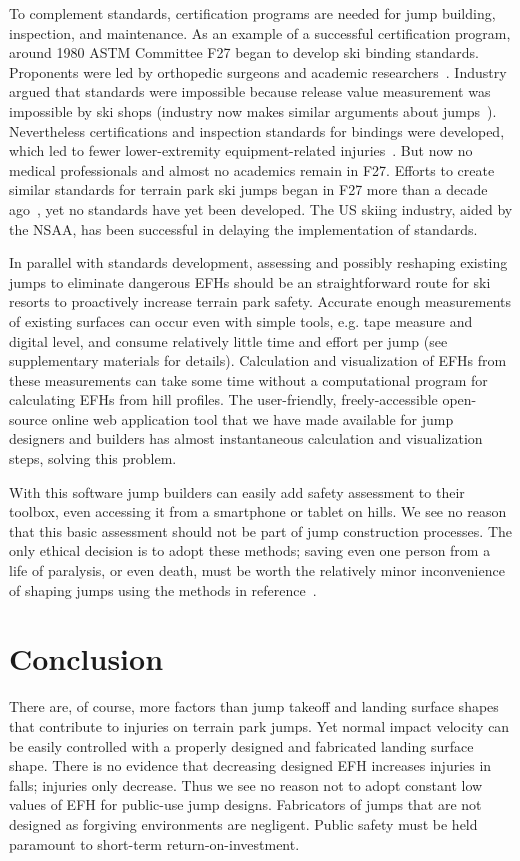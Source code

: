 \documentclass[smallextended]{svjour3}       %
\begin{document}
To complement standards, certification programs are needed for jump building,
inspection, and maintenance. As an example of a successful certification
program, around 1980 ASTM Committee F27 began to develop ski binding standards.
Proponents were led by orthopedic surgeons and academic
researchers~\cite{Bahniuk1996}. Industry argued that standards were impossible
because release value measurement was impossible by ski shops (industry now
makes similar arguments about jumps~\cite{NSAA2015}). Nevertheless
certifications and inspection standards for bindings were developed, which led
to fewer lower-extremity equipment-related injuries~\cite{Bahniuk1996}. But now
no medical professionals and almost no academics remain in F27. Efforts to
create similar standards for terrain park ski jumps began in F27 more than a
decade ago~\cite{SAM2011}, yet no standards have yet been developed. The US
skiing industry, aided by the NSAA, has been successful in delaying the
implementation of standards.

In parallel with standards development, assessing and possibly reshaping
existing jumps to eliminate dangerous EFHs should be an straightforward route
for ski resorts to proactively increase terrain park safety. Accurate enough
measurements of existing surfaces can occur even with simple tools, e.g. tape
measure and digital level, and consume relatively little time and effort per
jump (see supplementary materials for details). Calculation and visualization
of EFHs from these measurements can take some time without a computational
program for calculating EFHs from hill profiles. The user-friendly,
freely-accessible open-source online web application tool that we have made
available for jump designers and builders has almost instantaneous calculation
and visualization steps, solving this problem.

With this software jump builders can easily add safety assessment to their
toolbox, even accessing it from a smartphone or tablet on hills.  We see no
reason that this basic assessment should not be part of jump construction
processes. The only ethical decision is to adopt these methods; saving even one
person from a life of paralysis, or even death, must be worth the relatively
minor inconvenience of shaping jumps using the methods in
reference~\cite{Levy2015}.

\section{Conclusion}
\label{sec:conc}
%
There are, of course, more factors than jump takeoff and landing surface shapes
that contribute to injuries on terrain park jumps. Yet normal impact velocity
can be easily controlled with a properly designed and fabricated landing
surface shape. There is no evidence that decreasing designed EFH increases
injuries in falls; injuries only decrease. Thus we see no reason not to adopt
constant low values of EFH for public-use jump designs. Fabricators of jumps
that are not designed as forgiving environments are negligent. Public safety
must be held paramount to short-term return-on-investment.
\end{document}
